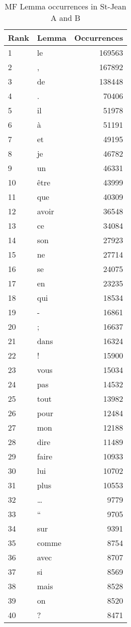 \begin{table}[H]
  \centering
  \caption{MF Lemma occurrences in St-Jean A and B}
  \label{tab:lemmas_occurences_st_jean}
  \begin{tabular}{l l r}
    \toprule
    Rank & Lemma & Occurrences \\
    \midrule
    1 & le & 169563 \\
    2 & , & 167892 \\
    3 & de & 138448 \\
    4 & . & 70406 \\
    5 & il & 51978 \\
    6 & à & 51191 \\
    7 & et & 49195 \\
    8 & je & 46782 \\
    9 & un & 46331 \\
    10 & être & 43999 \\
    11 & que & 40309 \\
    12 & avoir & 36548 \\
    13 & ce & 34084 \\
    14 & son & 27923 \\
    15 & ne & 27714 \\
    16 & se & 24075 \\
    17 & en & 23235 \\
    18 & qui & 18534 \\
    19 & - & 16861 \\
    20 & ; & 16637 \\
    21 & dans & 16324 \\
    22 & ! & 15900 \\
    23 & vous & 15034 \\
    24 & pas & 14532 \\
    25 & tout & 13982 \\
    26 & pour & 12484 \\
    27 & mon & 12188 \\
    28 & dire & 11489 \\
    29 & faire & 10933 \\
    30 & lui & 10702 \\
    31 & plus & 10553 \\
    32 & … & 9779 \\
    33 & “ & 9705 \\
    34 & sur & 9391 \\
    35 & comme & 8754 \\
    36 & avec & 8707 \\
    37 & si & 8569 \\
    38 & mais & 8528 \\
    39 & on & 8520 \\
    40 & ? & 8471 \\
    \bottomrule
  \end{tabular}
\end{table}

